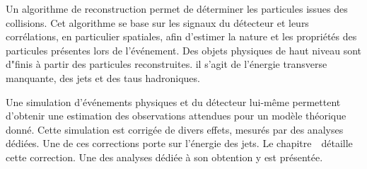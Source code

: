 \par
Un algorithme de reconstruction permet de déterminer les particules issues des collisions.
Cet algorithme se base sur les signaux du détecteur et leurs corrélations, en particulier spatiales, afin d'estimer la nature et les propriétés des particules présentes lors de l'événement.
Des objets physiques de haut niveau sont d"finis à partir des particules reconstruites.
il s'agit de l'énergie transverse manquante, des jets et des taus hadroniques.
\par
Une simulation d'événements physiques et du détecteur lui-même permettent d'obtenir une estimation des observations attendues pour un modèle théorique donné.
Cette simulation est corrigée de divers effets, mesurés par des analyses dédiées.
Une de ces corrections porte sur l'énergie des jets.
Le chapitre~\ détaille cette correction.
Une des analyses dédiée à son obtention y est présentée.